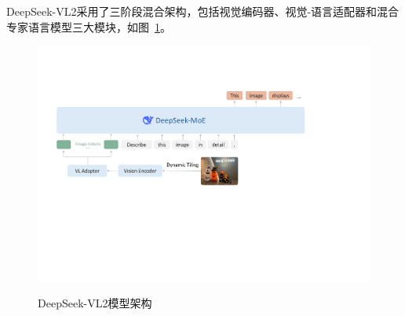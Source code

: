 DeepSeek-VL2\cite{wuDeepSeekVL2MixtureofExpertsVisionLanguage2024}采用了三阶段混合架构，包括视觉编码器、视觉-语言适配器和混合专家语言模型三大模块，如图~\ref{fig:deepseek_vl2_structure}。
\begin{figure}[ht]
    \centering
    \includegraphics[width=1\textwidth]
    {figures/deepseek_vl2_structure.pdf}\\
    \caption{DeepSeek-VL2模型架构\cite{wuDeepSeekVL2MixtureofExpertsVisionLanguage2024}}
    \label{fig:deepseek_vl2_structure} %
\end{figure}

